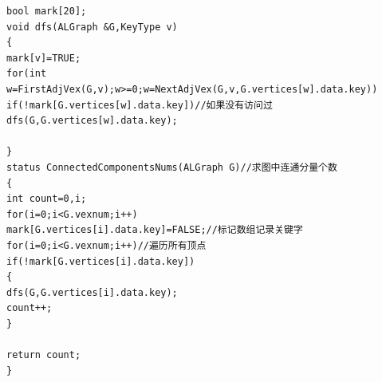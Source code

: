 \documentclass[supercite]{Experimental_Report}
\theoremstyle{definition}
\begin{document}
\begin{lstlisting}
bool mark[20];
void dfs(ALGraph &G,KeyType v)
{
mark[v]=TRUE;
for(int w=FirstAdjVex(G,v);w>=0;w=NextAdjVex(G,v,G.vertices[w].data.key)) 
if(!mark[G.vertices[w].data.key])//如果没有访问过
dfs(G,G.vertices[w].data.key);

}
status ConnectedComponentsNums(ALGraph G)//求图中连通分量个数 
{
int count=0,i;
for(i=0;i<G.vexnum;i++)
mark[G.vertices[i].data.key]=FALSE;//标记数组记录关键字 
for(i=0;i<G.vexnum;i++)//遍历所有顶点
if(!mark[G.vertices[i].data.key])
{
dfs(G,G.vertices[i].data.key);
count++;
}

return count;
} 
\end{lstlisting}
\end{document}
